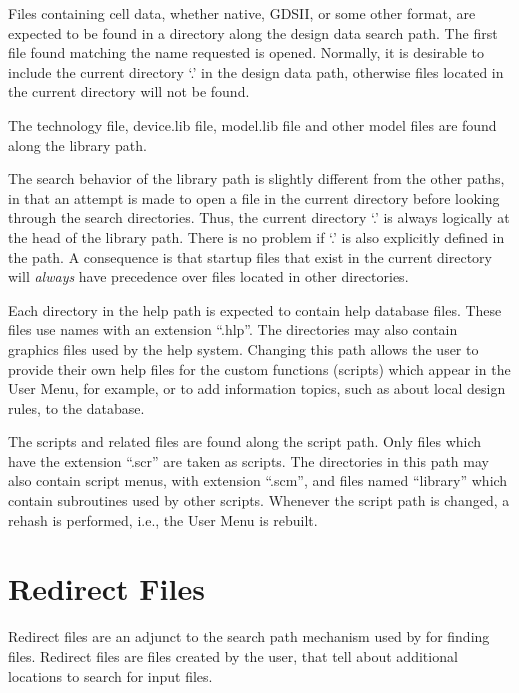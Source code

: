Files containing cell data, whether {\Xic} native, GDSII, or some
other format, are expected to be found in a directory along the design
data search path.  The first file found matching the name requested is
opened.  Normally, it is desirable to include the current directory
`.' in the design data path, otherwise files located in the current
directory will not be found.

The technology file, {\vt device.lib} file, {\vt model.lib} file and
other model files are found along the library path.

The search behavior of the library path is slightly different from the
other paths, in that an attempt is made to open a file in the current
directory before looking through the search directories.  Thus, the
current directory `.' is always logically at the head of the library
path.  There is no problem if `.' is also explicitly defined in the
path.  A consequence is that startup files that exist in the current
directory will {\it always} have precedence over files located in
other directories.

Each directory in the help path is expected to contain help database
files.  These files use names with an extension ``{\vt .hlp}''.  The
directories may also contain graphics files used by the help system. 
Changing this path allows the user to provide their own help files for
the custom functions (scripts) which appear in the {\cb User Menu},
for example, or to add information topics, such as about local design
rules, to the database.

The scripts and related files are found along the script path.  Only
files which have the extension ``{\vt .scr}'' are taken as scripts. 
The directories in this path may also contain script menus, with
extension ``{\vt .scm}'', and files named ``{\vt library}'' which
contain subroutines used by other scripts.  Whenever the script path
is changed, a {\cb rehash} is performed, i.e., the {\cb User Menu} is
rebuilt.


\section{Redirect Files}
Redirect files are an adjunct to the search path mechanism used by
{\Xic} for finding files.  Redirect files are files created by the
user, that tell {\Xic} about additional locations to search for input
files.

